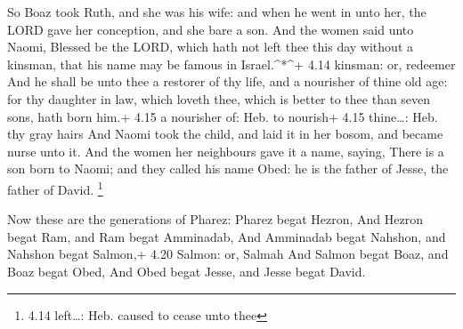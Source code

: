  So Boaz took Ruth, and she was his wife: and when he went
in unto her, the LORD gave her conception, and she bare a son.
 And the women said unto Naomi, Blessed be the LORD, which
hath not left thee this day without a kinsman, that his name may be
famous in Israel.\^{}*\^{}+ 4.14 kinsman: or, redeemer  And
he shall be unto thee a restorer of thy life, and a nourisher of thine
old age: for thy daughter in law, which loveth thee, which is better to
thee than seven sons, hath born him.+ 4.15 a nourisher of: Heb. to
nourish+ 4.15 thine\ldots: Heb. thy gray hairs  And Naomi
took the child, and laid it in her bosom, and became nurse unto it.
 And the women her neighbours gave it a name, saying, There
is a son born to Naomi; and they called his name Obed: he is the father
of Jesse, the father of David. \footnote{4.14 left\ldots: Heb. caused to
  cease unto thee}

 Now these are the generations of Pharez: Pharez begat
Hezron,  And Hezron begat Ram, and Ram begat Amminadab,
 And Amminadab begat Nahshon, and Nahshon begat Salmon,+
4.20 Salmon: or, Salmah  And Salmon begat Boaz, and Boaz
begat Obed,  And Obed begat Jesse, and Jesse begat David.

